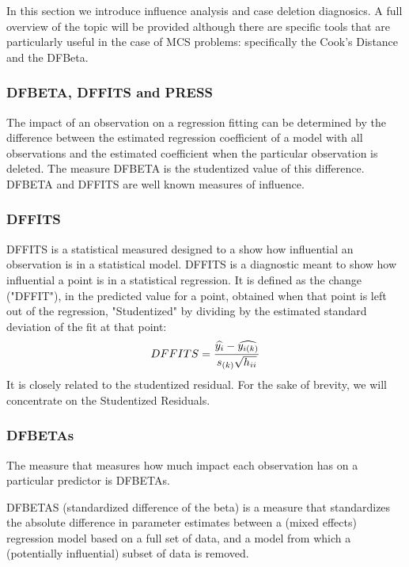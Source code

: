 \documentclass[12pt, a4paper]{report}
\theoremstyle{plain}
\theoremstyle{definition}
\theoremstyle{remark}
\begin{document}
	In this section we introduce influence analysis and case deletion diagnosics. A full overview of the topic will be provided although there are specific tools that are particularly useful in the case of MCS problems: specifically the Cook's Distance and the DFBeta.

	

	\subsubsection{DFBETA, DFFITS and PRESS}
	The impact of an observation on a regression fitting can be determined by the difference between the estimated regression coefficient of a model with all observations and the estimated coefficient when the particular observation is deleted. The measure DFBETA is the studentized value of this difference.
	DFBETA and DFFITS are well known measures of influence. 
	

\subsubsection{DFFITS} %
	DFFITS is a statistical measured designed to a show how influential an observation is in a statistical model. DFFITS is a diagnostic meant to show how influential a point is in a statistical regression. It is defined as the change ("DFFIT"), in the predicted value for a point, obtained when that point is left out of the regression, "Studentized" by dividing by the estimated standard deviation of the fit at that point:
	\begin{displaymath} DFFITS = {\widehat{y_i} -
		\widehat{y_{i(k)}} \over s_{(k)} \sqrt{h_{ii}}} \end{displaymath}
	It is closely related to the studentized residual. For the sake of brevity, we will concentrate on the Studentized Residuals.
	
	\subsubsection{DFBETAs}
	The measure that measures how much impact each observation has on a particular predictor is DFBETAs.
	
	
	DFBETAS (standardized difference of the beta) is a measure that standardizes the absolute difference in parameter estimates between a (mixed effects) regression model based on a full set of data, and a model from which a (potentially influential) subset of data is removed.
	
\end{document}
